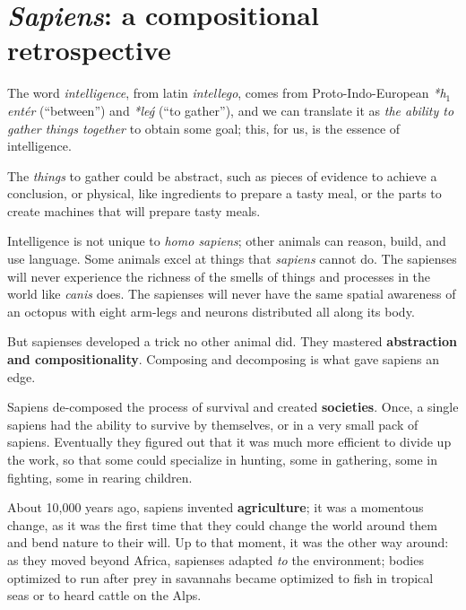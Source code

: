 
\section[Sapiens: a retrospective]{
  \emph{Sapiens}: a compositional retrospective
 }

\label{sec:brief-history}

The word \emph{intelligence}, from latin \emph{intellego}, comes from Proto-Indo-European  \emph{*h${}_1$entér} (``between'') and \emph{*leǵ} (``to gather''), and we can translate it as \emph{the ability to gather things together} to obtain some goal;
this, for us, is the essence of intelligence.

The \emph{things} to gather could be abstract, such as pieces of evidence to achieve a conclusion, or physical, like ingredients to prepare a tasty meal, or the parts to create machines that will prepare tasty meals.

Intelligence is not unique to \emph{homo sapiens}; other animals can reason, build, and use language.
Some animals excel at things that \emph{sapiens} cannot do.
The sapienses will never experience the richness of the smells of things and processes in the world like \emph{canis} does.
The sapienses will never have the same spatial awareness of an octopus with eight arm-legs and neurons distributed all along its body.

But sapienses developed a trick no other animal did.
They mastered \textbf{abstraction and compositionality}.
Composing and decomposing is what gave sapiens an edge.


Sapiens de-composed the process of survival and created \textbf{societies}.
Once, a single sapiens had the ability to survive by themselves, or in a very small pack of sapiens.
Eventually they figured out that it was much more efficient to divide up the work, so that some could specialize in hunting, some in gathering, some in fighting, some in rearing children.

About 10,000 years ago, sapiens invented \textbf{agriculture}; it was a momentous change, as it was the first time that they could change the world around them and bend nature to their will.
Up to that moment, it was the other way around: as they moved beyond Africa, sapienses adapted \emph{to} the environment;
bodies optimized to run after prey in savannahs became optimized to fish in tropical seas or to heard cattle on the Alps.

